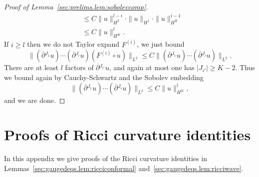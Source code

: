 \documentclass{article}
\newcommand{\ol}{\overline}
\newcommand{\pa}{\partial}
\begin{document}
\begin{proof}[Proof of Lemma~\ref{sec:prelims.lem:sobolevcomp}]
\begin{align}
        &\leq C\|u\|_{H^2}^{l-i}\cdot\|u\|_{H^1}\cdot\|u\|_{H^K}^{i-1} \nonumber\\
        &\leq C\|u\|_{H^K}^{l}.
    \end{align}
    If $i \geq l$ then we do not Taylor expand $F^{(i)}$, we just bound
    \begin{equation}
        \|(\ol{\pa}{}^{J_1}u) \cdots (\ol{\pa}{}^{J_i}u) (F^{(i)}\circ u)\|_{L^2} \leq C\|(\ol{\pa}{}^{J_1}u) \cdots (\ol{\pa}{}^{J_i}u)\|_{L^2}.
    \end{equation}
    There are at least $l$ factors of $\ol{\pa}{}^{J_{i'}} u$, and again at most one has $|J_{i'}| \geq K-2$. Thus we bound again by Cauchy-Schwartz and the Sobolev embedding
    \begin{equation}
        \|(\ol{\pa}{}^{J_1}u) \cdots (\ol{\pa}{}^{J_i}u)\|_{L^2} \leq C\|u\|_{H^K}^{l},
    \end{equation}
    and we are done.
\end{proof}
\section{Proofs of Ricci curvature identities}\label{app:ricciids}
In this appendix we give proofs of the Ricci curvature identities in Lemmas~\ref{sec:gaugedeqs.lem:ricciconformal} and~\ref{sec:gaugedeqs.lem:ricciwave}.
\end{document}

